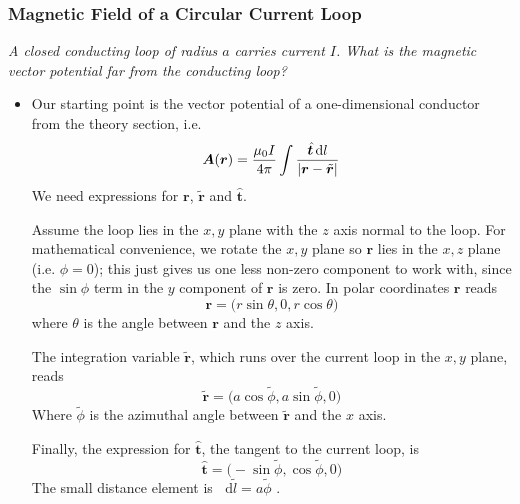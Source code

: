 \documentclass[11pt, a4paper]{article}
\newcommand{\diff}{\mathop{}\!\mathrm{d}} %
\renewcommand{\vec}[1]{\bm{#1}} %
\newcommand{\uvec}[1]{\hat{\vec{#1}}} %
\newcommand{\tvec}[1]{\tilde{\vec{#1}}} %
\renewcommand{\r}{\vec{r}}
\newcommand{\A}{\vec{A}} %
\begin{document}
\subsubsection{Magnetic Field of a Circular Current Loop}
\textit{A closed conducting loop of radius $ a $ carries current $ I $. What is the magnetic vector potential far from the conducting loop?}
\begin{itemize}
	\item Our starting point is the vector potential of a one-dimensional conductor from the theory section, i.e.
	\begin{equation*}
		\A(\r) = \frac{\mu_{0}I}{4\pi} \int \frac{\uvec{t} \diff l}{\abs{\r - \tvec{r}}}
	\end{equation*}
	We need expressions for $ \r $, $ \tvec{r} $ and $ \uvec{t} $.
	
	Assume the loop lies in the $ x, y $ plane with the $ z $ axis normal to the loop. For mathematical convenience, we rotate the $ x, y $ plane so $ \r $ lies in the $ x, z $ plane (i.e. $ \phi = 0 $); this just gives us one less non-zero component to work with, since the $ \sin \phi $ term in the $ y $ component of $ \r $ is zero. In polar coordinates $ \r $ reads
	\begin{equation*}
		\r = \big (r \sin \theta, 0, r \cos \theta \big )
	\end{equation*}
	where $ \theta $ is the angle between $ \r $ and the $ z $ axis. 
	
	The integration variable $ \tvec{r} $, which runs over the current loop in the $ x, y $ plane, reads
	\begin{equation*}
		\tvec{r} = \big(a \cos \tilde{\phi}, a \sin \tilde{\phi}, 0 \big)
	\end{equation*}
	Where $ \tilde{\phi} $ is the azimuthal angle between $ \tvec{r} $ and the $ x $ axis. 
	
	Finally, the expression for $ \uvec{t} $, the tangent to the current loop, is
	\begin{equation*}
		\uvec{t} = \big( -\sin \tilde{\phi},  \cos \tilde{\phi}, 0\big)
	\end{equation*}
	The small distance element is $ \diff \tilde{l} = a \tilde{\phi}$ .
	

\end{itemize}
\end{document}
